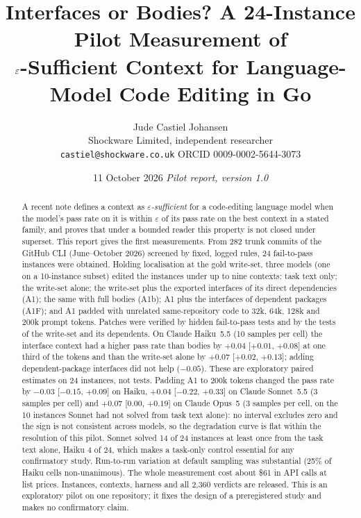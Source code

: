 \documentclass[10pt]{article}
\title{Interfaces or Bodies? A 24-Instance Pilot Measurement of\\ $\eps$-Sufficient Context for Language-Model Code Editing in Go}
\author{Jude Castiel Johansen\\ Shockware Limited, independent researcher\\ \texttt{castiel@shockware.co.uk} \quad ORCID 0009-0002-5644-3073}
\date{11 October 2026 \quad\textit{Pilot report, version 1.0}}
\newcommand{\eps}{\varepsilon}
\begin{document}
\maketitle

\begin{abstract}
A recent note defines a context as \emph{$\eps$-sufficient} for a code-editing language model when the model's pass rate on it is within $\eps$ of its pass rate on the best context in a stated family, and proves that under a bounded reader this property is not closed under superset. This report gives the first measurements. From 282 trunk commits of the GitHub CLI (June--October 2026) screened by fixed, logged rules, 24 fail-to-pass instances were obtained. Holding localisation at the gold write-set, three models (one on a 10-instance subset) edited the instances under up to nine contexts: task text only; the write-set alone; the write-set plus the exported interfaces of its direct dependencies (A1); the same with full bodies (A1b); A1 plus the interfaces of dependent packages (A1F); and A1 padded with unrelated same-repository code to 32k, 64k, 128k and 200k prompt tokens. Patches were verified by hidden fail-to-pass tests and by the tests of the write-set and its dependents. On Claude Haiku~5.5 (10 samples per cell) the interface context had a higher pass rate than bodies by $+0.04$ [$+0.01$, $+0.08$] at one third of the tokens and than the write-set alone by $+0.07$ [$+0.02$, $+0.13$]; adding dependent-package interfaces did not help ($-0.05$). These are exploratory paired estimates on 24 instances, not tests. Padding A1 to 200k tokens changed the pass rate by $-0.03$ [$-0.15$, $+0.09$] on Haiku, $+0.04$ [$-0.22$, $+0.33$] on Claude Sonnet~5.5 (3 samples per cell) and $+0.07$ [$0.00$, $+0.19$] on Claude Opus~5 (3 samples per cell, on the 10 instances Sonnet had not solved from task text alone): no interval excludes zero and the sign is not consistent across models, so the degradation curve is flat within the resolution of this pilot. Sonnet solved 14 of 24 instances at least once from the task text alone, Haiku 4 of 24, which makes a task-only control essential for any confirmatory study. Run-to-run variation at default sampling was substantial (25\% of Haiku cells non-unanimous). The whole measurement cost about \$61 in API calls at list prices. Instances, contexts, harness and all 2,360 verdicts are released. This is an exploratory pilot on one repository; it fixes the design of a preregistered study and makes no confirmatory claim.
\end{abstract}
\end{document}
